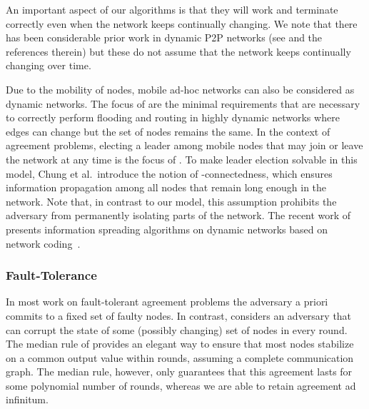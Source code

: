 \documentclass[leqno,11pt]{article}
\begin{document}
An important aspect of our algorithms  is that they will work and terminate correctly even when the
  network keeps continually changing.  We note that there has been
considerable prior work in dynamic P2P networks (see \cite{PRU01} and the references therein) but these do not assume that
the network keeps continually changing over time.







Due to the mobility of nodes, mobile ad-hoc networks can also be considered as
dynamic networks. The focus of \cite{OW05} are the minimal requirements
that are necessary to correctly perform flooding and routing in highly dynamic
networks where edges can change but the set of nodes remains the same. In the
context of agreement problems, electing a leader among mobile nodes that may
join or leave the network at any time is the focus of \cite{CRW11}. To make
leader election solvable in this model, Chung et al.\ introduce the notion of
-connectedness, which ensures information propagation among all nodes that
remain long enough in the network. Note that, in contrast to our model, this
assumption prohibits the adversary from permanently isolating parts of the
network. The recent work of~\cite{haeupler+k:dynamic} presents
information spreading algorithms on dynamic networks based on network
coding~\cite{ahlswede+cly:coding}. 

\subsubsection{Fault-Tolerance}

In most work on fault-tolerant agreement problems 
the adversary a priori commits to a fixed set of faulty nodes.
In contrast, \cite{DGMSS11} considers an adversary that can corrupt the
state of some (possibly changing) set of  nodes in every round.
The median rule of \cite{DGMSS11} provides an elegant way to ensure that
most nodes stabilize on a common output value within  rounds,
assuming a complete communication graph. The median rule, however, only
guarantees that this agreement lasts for some polynomial number of rounds,
whereas we are able to retain agreement ad infinitum.
\end{document}
